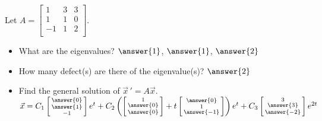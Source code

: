 \documentclass{ximera}
\begin{document}
\begin{exercise}%
    Let $A =
    \left[ 
        \begin{smallmatrix}
            1 & 3 & 3 \\
            1 & 1 & 0 \\
            -1 & 1 & 2 \\
        \end{smallmatrix}
    \right]$.  
    \begin{itemize}
        \item What are the eigenvalues? $\answer{1}$, $\answer{1}$, $\answer{2}$
        \item How many defect(s) are there of the eigenvalue(s)? $\answer{2}$
        \item Find the general solution of $\vec{x}\,' = A\vec{x}$.\\
            $\vec{x} = C_1
            \left[ \begin{smallmatrix}
                \answer{0} \\ \answer{1} \\ -1
            \end{smallmatrix}\right]
            e^{t} + C_2
            \left(
                \left[ \begin{smallmatrix}
                    1 \\ \answer{0} \\ \answer{0}
                \end{smallmatrix}\right]
                + t 
                \left[ \begin{smallmatrix}
                    \answer{0} \\ 1 \\ \answer{-1}
                \end{smallmatrix}\right]
            \right)
            e^{t} + C_3
            \left[ \begin{smallmatrix}
                3 \\ \answer{3} \\ \answer{-2}
            \end{smallmatrix}\right]
            e^{2t}$
    \end{itemize}
\end{exercise}
\end{document}

